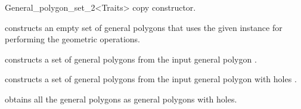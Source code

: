 \begin{ccRefClass}{General_polygon_set_2<Traits>}
  {copy constructor.}
        
  {constructs an empty set of general polygons that uses the given
   instance for performing the geometric operations.}

  {constructs a set of general polygons from the input general polygon
  .}

  {constructs a set of general polygons from the input general polygon
  with holes .}

%   

\ccAccessFunctions
\ccThreeToTwo

  {obtains all the general polygons as general polygons with
  holes.}
  


\end{ccRefClass}
